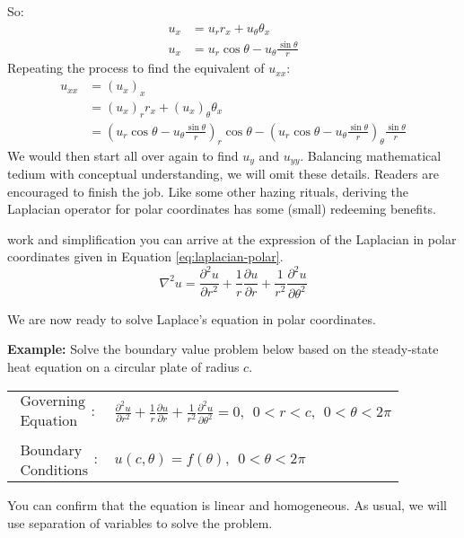 So:
\begin{align*}
u_x &= u_r r_x + u_{\theta} \theta_x \\
u_x &= u_r \cos{\theta} - u_{\theta}\frac{\sin{\theta}}{r}
\end{align*}
Repeating the process to find the equivalent of $u_{xx}$:
\begin{align*}
u_{xx} &= \left(u_{x}\right)_{x} \\
&= \left(u_x\right)_r r_x + \left(u_x\right)_{\theta} \theta_x \\
&= \left(u_r \cos{\theta} - u_{\theta}\frac{\sin{\theta}}{r} \right)_r \cos{\theta} - \left( u_r \cos{\theta} - u_{\theta}\frac{\sin{\theta}}{r}\right)_{\theta}\frac{\sin{\theta}}{r}
\end{align*}
We would then start all over again to find $u_y$ and $u_{yy}$.  Balancing mathematical tedium with conceptual understanding, we will omit these details.  Readers are encouraged to finish the job.  Like some other hazing rituals, deriving the Laplacian operator for polar coordinates has some (small) redeeming benefits.

 work and simplification you can arrive at the expression of the Laplacian in polar coordinates given in Equation \ref{eq:laplacian-polar}.
\begin{equation}
\nabla^2u = \frac{\partial^2 u}{\partial r^2} + \frac{1}{r}\frac{\partial u}{\partial r} + \frac{1}{r^2}\frac{\partial^2 u}{\partial \theta^2}
\label{eq:laplacian-polar}
\end{equation}

We are now ready to solve Laplace's equation in polar coordinates.

\vspace{0.25cm}

\noindent\textbf{Example:} Solve the boundary value problem below based on the steady-state heat equation on a circular plate of radius $c$.

\begin{table}[h]
\begin{tabular}{l l}
$\substack{\text{Governing} \\\text{Equation}}: $& $\frac{\partial^2 u}{\partial r^2} + \frac{1}{r}\frac{\partial u}{\partial r} + \frac{1}{r^2}\frac{\partial^2 u}{\partial \theta^2}= 0, \ \ 0<r<c, \ \ 0<\theta<2 \pi $\\
& \\
$\substack{\text{Boundary} \\ \text{Conditions}}: $ & $u(c,\theta) = f(\theta), \ \ 0 < \theta< 2 \pi$\\
\end{tabular}
\end{table} 
You can confirm that the equation is linear and homogeneous.  As usual, we will use separation of variables to solve the problem.

